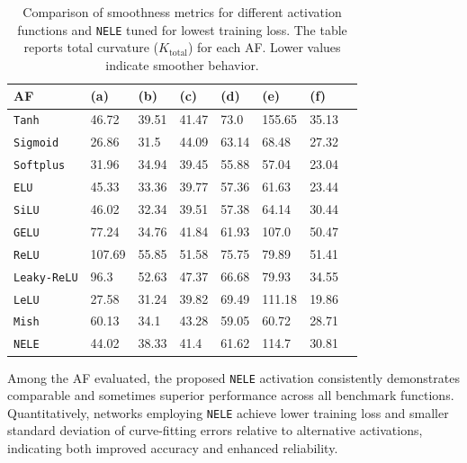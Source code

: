 \documentclass[manuscript, screen, review]{jair}
\begin{document}
\begin{table}
  \caption{Comparison of smoothness metrics for different activation functions and \texttt{NELE} tuned for lowest training loss. 
The table reports total curvature ($K_\text{total}$) for each AF. 
Lower values indicate smoother behavior.}
  \label{tab:smooth}
  \begin{tabular}{@{}llllllll@{}}
    \toprule
    AF & (a) & (b) & (c) & (d) & (e) & (f) \\
    \midrule
    \texttt{Tanh} & 46.72 & 39.51 & 41.47 & 73.0 & 155.65 & 35.13 \\ 
    \texttt{Sigmoid} & 26.86 & 31.5 & 44.09 & 63.14 & 68.48 & 27.32 \\ 
    \texttt{Softplus} & 31.96 & 34.94 & 39.45 & 55.88 & 57.04 & 23.04 \\ 
    \texttt{ELU} & 45.33 & 33.36 & 39.77 & 57.36 & 61.63 & 23.44 \\ 
    \texttt{SiLU} & 46.02 & 32.34 & 39.51 & 57.38 & 64.14 & 30.44 \\ 
    \texttt{GELU} & 77.24 & 34.76 & 41.84 & 61.93 & 107.0 & 50.47 \\ 
    \texttt{ReLU} & 107.69 & 55.85 & 51.58 & 75.75 & 79.89 & 51.41 \\ 
    \texttt{Leaky-ReLU} & 96.3 & 52.63 & 47.37 & 66.68 & 79.93 & 34.55 \\ 
    \texttt{LeLU} & 27.58 & 31.24 & 39.82 & 69.49 & 111.18 & 19.86 \\ 
    \texttt{Mish} & 60.13 & 34.1 & 43.28 & 59.05 & 60.72 & 28.71 \\ 
    \texttt{NELE} & 44.02 & 38.33 & 41.4 & 61.62 & 114.7 & 30.81 \\ 
  \bottomrule
\end{tabular}
\end{table}

Among the AF evaluated, the proposed \texttt{NELE} activation 
consistently demonstrates comparable and sometimes superior performance across all benchmark functions. 
Quantitatively, networks employing \texttt{NELE} achieve lower training loss and smaller 
standard deviation of curve-fitting errors relative to alternative activations, 
indicating both improved accuracy and enhanced reliability.
\end{document}
